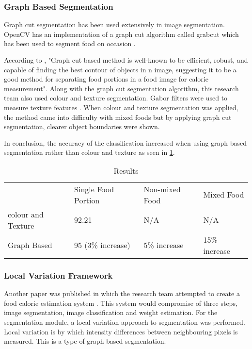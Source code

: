 \tocless\subsubsection{Graph Based Segmentation}
Graph cut segmentation has been used extensively  in image segmentation. OpenCV
has an implementation of a graph cut algorithm called grabcut which has been
used to segment food on occasion \parencite{graphCut}. 

According to \parencite{graphCut}, "Graph cut based method is well-known to be
efficient, robust, and capable of finding the best contour of objects in n
image, suggesting it to be a good method for separating food portions in a food
image for calorie measurement". Along with the graph cut segmentation algorithm,
this research team also used colour and texture segmentation. Gabor filters were
used to measure texture features \parencite{graphCut}. When colour and texture
segmentation was applied, the method came into difficulty with mixed foods but
by applying graph cut segmentation, clearer object boundaries were shown.

In conclusion, the accuracy of the classification increased when using graph
based segmentation rather than colour and texture as seen in \ref{graphCT}.

\begin{table}[]
	\centering
	\caption{Results}
	\label{graphCT}
	\begin{tabular}{llll}
		                  & Single Food Portion & Non-mixed Food & Mixed Food
						  \\
						  colour and Texture & 92.21               & N/A
						  & N/A           \\
						  Graph Based       & 95 (3\% increase)   & 5\% increase
						  & 15\% increase
	\end{tabular}
\end{table}

\tocless\subsubsection{Local Variation Framework}
Another paper was published in which the research team attempted to create a
food calorie estimation system \parencite{foodImageAnalysis}. This system would
compromise of three steps, image segmentation, image classification and weight
estimation. For the segmentation module, a local variation approach to
segmentation was performed. Local variation is by which intensity differences
between neighbouring pixels is measured. This is a type of graph based
segmentation.

